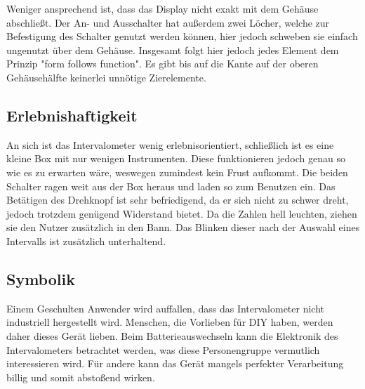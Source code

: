 \documentclass[a4paper,10pt]{article}
\begin{document}
Weniger ansprechend ist, dass das Display nicht exakt mit dem Gehäuse abschließt. Der An- und Ausschalter hat außerdem zwei Löcher, welche zur Befestigung des Schalter genutzt werden können, hier jedoch schweben sie einfach ungenutzt über dem Gehäuse. Insgesamt folgt hier jedoch jedes Element dem Prinzip "form follows function". Es gibt bis auf die Kante auf der oberen Gehäusehälfte keinerlei unnötige Zierelemente.

\subsection*{Erlebnishaftigkeit}
An sich ist das Intervalometer wenig erlebnisorientiert, schließlich ist es eine kleine Box mit nur wenigen Instrumenten. Diese funktionieren jedoch genau so wie es zu erwarten wäre, weswegen zumindest kein Frust aufkommt. Die beiden Schalter ragen weit aus der Box heraus und laden so zum Benutzen ein. Das Betätigen des Drehknopf ist sehr befriedigend, da er sich nicht zu schwer dreht, jedoch trotzdem genügend Widerstand bietet. Da die Zahlen hell leuchten, ziehen sie den Nutzer zusätzlich in den Bann. Das Blinken dieser nach der Auswahl eines Intervalls ist zusätzlich unterhaltend.

\subsection*{Symbolik}
Einem Geschulten Anwender wird auffallen, dass das Intervalometer nicht industriell hergestellt wird. Menschen, die Vorlieben für DIY haben, werden daher dieses Gerät lieben. Beim Batterieauswechseln kann die Elektronik des Intervalometers betrachtet werden, was diese Personengruppe vermutlich interessieren wird. Für andere kann das Gerät mangels perfekter Verarbeitung billig und somit abstoßend wirken.
\end{document}
